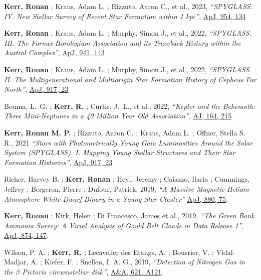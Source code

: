 \documentclass[12pt,a4paper,sans,xetex]{moderncv}        %
\begin{document}
\begin{etaremune}[topsep=0pt,itemsep=0pt,partopsep=0pt,parsep=0pt]


\item \textbf{Kerr, Ronan} ; Kraus, Adam L. ; Rizzuto, Aaron C., et al., 2023, \textit{``SPYGLASS. IV. New Stellar Survey of Recent Star Formation within 1 kpc''}, \href{https://ui.adsabs.harvard.edu/abs/2023ApJ...954..134K/abstract} {ApJ, 954, 134}

\item \textbf{Kerr, Ronan} ; Kraus, Adam L. ; Murphy, Simon J., et al., 2022, \textit{``SPYGLASS. III. The Fornax-Horologium Association and its Traceback History within the Austral Complex''}, \href{https://ui.adsabs.harvard.edu/abs/2022ApJ...941..143K/abstract} {ApJ, 941, 143}

\item \textbf{Kerr, Ronan} ; Kraus, Adam L. ; Murphy, Simon J., et al., 2022, \textit{``SPYGLASS. II. The Multigenerational and Multiorigin Star Formation History of Cepheus Far North''}, \href{https://ui.adsabs.harvard.edu/abs/2022ApJ...941...49K/abstract} {ApJ, 917, 23}

\item Bouma, L.~G. ; \textbf{Kerr, R.} ; Curtis, J.~L., et al., 2022, \textit{``Kepler and the Behemoth: Three Mini-Neptunes in a 40 Million Year Old Association''}, \href{https://ui.adsabs.harvard.edu/abs/2022AJ....164..215B/abstract} {AJ, 164, 215}

\item \textbf{Kerr, Ronan M. P.} ;  Rizzuto, Aaron C.  ;  Kraus, Adam L. ;  Offner, Stella S. R., 2021 \textit{``Stars with Photometrically Young Gaia Luminosities Around the Solar System (SPYGLASS). I. Mapping Young Stellar Structures and Their Star Formation Histories''}, \href{https://ui.adsabs.harvard.edu/abs/2021ApJ...917...23K/abstract}{ApJ, 917, 23}

\item Richer, Harvey B. ;  \textbf{Kerr, Ronan} ;  Heyl, Jeremy ;  Caiazzo, Ilaria ;  Cummings, Jeffrey ; Bergeron, Pierre ;  Dufour, Patrick, 2019,  \textit{``A Massive Magnetic Helium Atmosphere White Dwarf Binary in a Young Star Cluster''} \href{https://ui.adsabs.harvard.edu/abs/2019ApJ...880...75R/abstract}{ApJ, 880, 75}.

\item \textbf{Kerr, Ronan} ;  Kirk, Helen ;  Di Francesco, James et al., 2019, \textit{``The Green Bank Ammonia Survey: A Virial Analysis of Gould Belt Clouds in Data Release 1''}, \href{https://ui.adsabs.harvard.edu/abs/2019ApJ...874..147K/abstract}{ApJ, 874, 147}. 

\item Wilson, P. A. ;  \textbf{Kerr, R.} ;  Lecavelier des Etangs, A. ;  Bourrier, V. ;  Vidal-Madjar, A. ; Kiefer, F. ;  Snellen, I. A. G., 2019, \textit{``Detection of Nitrogen Gas in the $\beta$ Pictoris circumstellar disk''},
\href{https://ui.adsabs.harvard.edu/abs/2019A\%26A...621A.121W/abstract}{A\&A, 621, A121}.
\end{etaremune}
\end{document}
